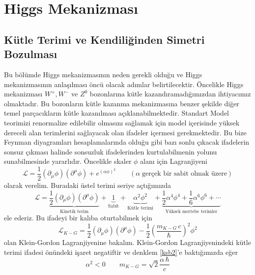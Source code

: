 \chapter{Higgs Mekanizması}
\section{Kütle Terimi ve Kendiliğinden Simetri Bozulması}
Bu bölümde Higgs mekanizmasının neden gerekli olduğu ve Higgs mekanizmasının anlaşılması öncü olacak adımlar belirtilecektir. Öncelikle Higgs mekanizması $W^{+},W^{-}$ ve $Z^{0}$ bozonlarına kütle kazandıramadığımızdan ihtiyacımız olmaktadır. Bu bozonların kütle kazanma mekanizmasına benzer şekilde diğer temel parçacıkların kütle kazanılması açıklanabilmektedir. Standart Model teorimizi renormalize edilebilir olmasını sağlamak için model içerisinde yüksek dereceli alan terimlerini sağlayacak olan ifadeler içermesi gerekmektedir. Bu bize Feynman diyagramları hesaplamalarında olduğu gibi bazı sonlu çıkacak ifadelerin sonsuz çıkması halinde sonsuzluk ifadelerinden kurtulabilmenin yolunu sunabilmesinde yararlıdır. Öncelikle skaler $\phi$ alanı için Lagranjiyeni
\begin{equation} \label{ksb1}
\mathcal{L} = \frac{1}{2}(\partial_{\mu}\phi)(\partial^{\mu}\phi) + e^{(\alpha\phi)^{2}}\qquad(\alpha\;\textrm{gerçek bir sabit olmak üzere})
\end{equation}
olarak verelim. Buradaki üstel terimi seriye açtığımızda
\begin{equation} \label{ksb2}
\mathcal{L} = \underbrace{ \frac{1}{2}(\partial_{\mu}\phi)(\partial^{\mu}\phi)}_{\textrm{Kinetik terim}} +  \underbrace{1}_{\textrm{Sabit}} + \underbrace{ \alpha^{2}\phi^{2}}_{\textrm{Kütle terimi}} + \underbrace{ \frac{1}{2}\alpha^{4}\phi^{4} + \frac{1}{6}\alpha^{6}\phi^{6} + \cdots }_{\textrm{Yüksek mertebe terimler}}
\end{equation}
ele ederiz. Bu ifadeyi bir kalıba oturtabilmek için
\begin{equation} \label{ksb3}
\mathcal{L}_{K-G} = \frac{1}{2}(\partial_{\mu}\phi)(\partial^{\mu}\phi) - \frac{1}{2}\left(\frac{m_{K-G}\,c}{\hbar}\right)^{2} \phi^{2}
\end{equation}
olan Klein-Gordon Lagranjiyenine bakalım.	Klein-Gordon Lagranjiyenindeki kütle terimi ifadesi önündeki işaret negatiftir ve denklem \eqref{ksb2}'e baktığımızda eğer
$$
\alpha^{2} < 0 \qquad m_{K-G} = \sqrt{2}\frac{\alpha\, \hbar}{c}
$$ 
